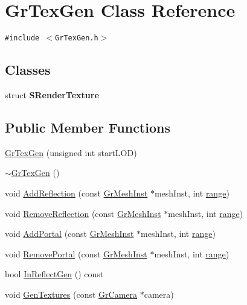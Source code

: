 \hypertarget{class_gr_tex_gen}{
\section{GrTexGen Class Reference}
\label{class_gr_tex_gen}
}
{\tt \#include $<$GrTexGen.h$>$}

\subsection*{Classes}
\begin{CompactItemize}
\item 
struct \textbf{SRenderTexture}
\end{CompactItemize}
\subsection*{Public Member Functions}
\begin{CompactItemize}
\item 
\hyperlink{class_gr_tex_gen_654355d0d9ad9c48abe0dff18787b7c3}{GrTexGen} (unsigned int startLOD)
\item 
\hyperlink{class_gr_tex_gen_b90bc3244b7902ec2e8e074bc45f37b7}{$\sim$GrTexGen} ()
\item 
void \hyperlink{class_gr_tex_gen_64dbd7edc5613d3ca054df90a3c5f849}{AddReflection} (const \hyperlink{class_gr_mesh_inst}{GrMeshInst} $\ast$meshInst, int \hyperlink{glext__bak_8h_7b8ad0b27a927682837f95528fa454f5}{range})
\item 
void \hyperlink{class_gr_tex_gen_9bab9a898273d7d9a305af9cf9846796}{RemoveReflection} (const \hyperlink{class_gr_mesh_inst}{GrMeshInst} $\ast$meshInst, int \hyperlink{glext__bak_8h_7b8ad0b27a927682837f95528fa454f5}{range})
\item 
void \hyperlink{class_gr_tex_gen_795148634523ef076d51e58e1e7a8ace}{AddPortal} (const \hyperlink{class_gr_mesh_inst}{GrMeshInst} $\ast$meshInst, int \hyperlink{glext__bak_8h_7b8ad0b27a927682837f95528fa454f5}{range})
\item 
void \hyperlink{class_gr_tex_gen_a8981d6674916e685436eb441553ac45}{RemovePortal} (const \hyperlink{class_gr_mesh_inst}{GrMeshInst} $\ast$meshInst, int \hyperlink{glext__bak_8h_7b8ad0b27a927682837f95528fa454f5}{range})
\item 
bool \hyperlink{class_gr_tex_gen_717606667a09d57960162abcdccd87dc}{InReflectGen} () const 
\item 
void \hyperlink{class_gr_tex_gen_2b7147f4005460de60c3db9ed919c998}{GenTextures} (const \hyperlink{class_gr_camera}{GrCamera} $\ast$camera)
\end{CompactItemize}


